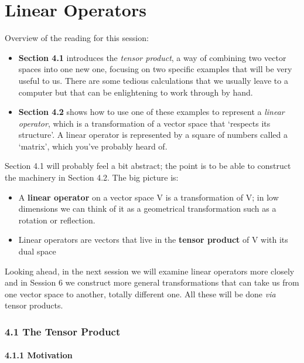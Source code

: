 \documentclass[oneside,english]{amsbook}
\numberwithin{section}{chapter}
\theoremstyle{plain}
\theoremstyle{definition}
\begin{document}
\chapter{Linear Operators}\label{linear-operators}

Overview of the reading for this session:

\begin{itemize}
	\item
	\textbf{Section 4.1} introduces the \emph{tensor product}, a way of
	combining two vector spaces into one new one, focusing on two specific
	examples that will be very useful to us. There are some tedious
	calculations that we usually leave to a computer but that can be
	enlightening to work through by hand.
	\item
	\textbf{Section 4.2} shows how to use one of these examples to
	represent a \emph{linear operator}, which is a transformation of a
	vector space that `respects its structure'. A linear operator is
	represented by a square of numbers called a `matrix', which you've
	probably heard of.
\end{itemize}

Section 4.1 will probably feel a bit abstract; the point is to be able
to construct the machinery in Section 4.2. The big picture is:

\begin{itemize}
	\item
	A \textbf{linear operator} on a vector space V is a transformation of
	V; in low dimensions we can think of it as a geometrical
	transformation such as a rotation or reflection.
	\item
	Linear operators are vectors that live in the \textbf{tensor product}
	of V with its dual space
\end{itemize}

Looking ahead, in the next session we will examine linear operators more
closely and in Session 6 we construct more general transformations that
can take us from one vector space to another, totally different one. All
these will be done \emph{via} tensor products.

\subsection{4.1 The Tensor Product}\label{the-tensor-product}

\subsubsection{4.1.1 Motivation}\label{motivation}
\end{document}
